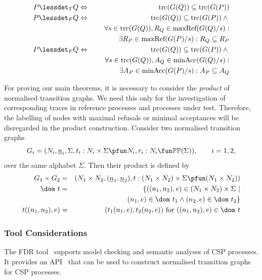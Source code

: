\begin{lemma}
\label{lemma:tgtrcref}
\begin{eqnarray}
P \lessdet_T Q & \Leftrightarrow & \trc(G(Q)) \subseteq\trc(G(P))
\label{eq:trcrefa}
\\
\label{eq:failrefa}
P \lessdet_F Q & \Leftrightarrow & \trc(G(Q)) \subseteq\trc(G(P)) \wedge {} \nonumber
\\ & & \forall s\in\trc(G(Q)), R_Q\in\maxrefs(G(Q)/s):  \nonumber
\\ & & \tabd
\exists R_P\in\maxrefs(G(P)/s): R_Q\subseteq R_P
\\
\label{eq:failrefb}
P \lessdet_F Q & \Leftrightarrow & \trc(G(Q)) \subseteq\trc(G(P)) \wedge {} \nonumber
\\ & & \forall s\in\trc(G(Q)), A_Q\in\minaccs(G(Q)/s): \nonumber
\\ & & \tabd
\exists A_P\in\minaccs(G(P)/s): A_P\subseteq A_Q
\end{eqnarray}
\xbox
\end{lemma}

For proving our main theorems, it is necessary to consider the \emph{product} of 
normalised transition graphs. We need this only for the investigation of corresponding traces in reference processes and processes under test. Therefore, the 
labelling of nodes with maximal refusals or minimal acceptances   will be disregarded in the 
product construction.
Consider two normalised transition graphs 
\[
G_i = ( N_i, \ii n_i, \Sigma, t_i : N_i\times\Sigma \pfun N_i, r_i : N_i \fun \mathbb{P}\mathbb{P}(\Sigma)),\qquad i = 1,2,
\]
over the same alphabet $\Sigma$. Then their product is defined by
\begin{eqnarray}
G_1\times G_2 & = & (N_1\times N_2,(\ii n_1,\ii n_2), t:(N_1\times N_2)\times\Sigma\pfun (N_1\times N_2))
\\
\dom~t & = & \{ ((n_1,n_2),e)\in (N_1\times N_2)\times\Sigma~|   \nonumber
\\ & & \tabc
(n_1,e)\in\dom~t_1\wedge 
(n_2,e) \in\dom~t_2    \}
\\
t((n_1,n_2),e) & = & (t_1(n_1,e),t_2(n_2,e))\ \text{for $((n_1,n_2),e)\in\dom~t$}
\end{eqnarray}



\subsubsection*{Tool Considerations}
The FDR tool~\cite{fdr} supports model checking and semantic analyses of CSP
processes. It provides an API~\cite{fdrmanual} that can be used to construct
normalised transition graphs for CSP processes.

